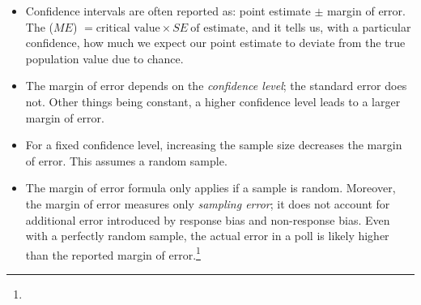 \newpage
{}
\noindent\begin{itemize}
\item Confidence intervals are often reported as: point estimate $\pm$ margin of error.  The  ($ME$) $=\text{critical value} \times SE\ \text{of estimate}$, and it tells us, with a particular confidence, how much we expect our point estimate to deviate from the true population value due to chance.  

\item The margin of error depends on the \emph{confidence level}; the standard error does not.  Other things being constant, a higher confidence level leads to a larger margin of error.  

\item For a fixed confidence level, increasing the sample size decreases the margin of error.  This assumes a random sample.

\item The margin of error formula only applies if a sample is random.  Moreover, the margin of error measures only \emph{sampling error}; it does not account for additional error introduced by response bias and non-response bias.  Even with a perfectly random sample, the actual error in a poll is likely higher than the reported margin of error.\footnote{}

\end{itemize}


{}

